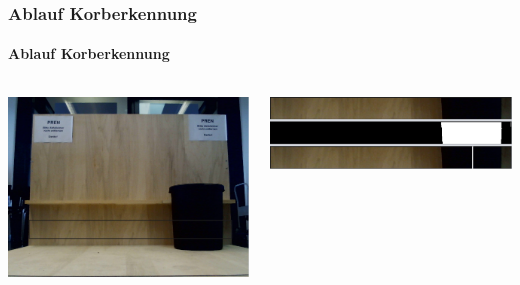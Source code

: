 \begin{frame}
    \frametitle{Ablauf Korberkennung}
    \framesubtitle{Ablauf Korberkennung}
    \begin{columns}
            \centering
            \includegraphics[width=1.0\textwidth, trim=0 40 0 120, clip=true]{../doc/fig/BildMitKorb_markiert.png}
            \rule{0pt}{5pt}
            \includegraphics[width=1\textwidth]{../doc/fig/Korberkennung_Schritte.png}
    \end{columns}
\end{frame}

